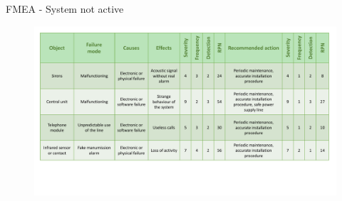 \begin{frame}{FMEA - System not active}
      \vskip 1.0cm
    \begin{figure}[ht!]
      \includegraphics[width=120mm]{images/fmea_system_not_active.pdf}
      \label{fig:fmea_system_not_active}
    \end{figure}
\end{frame}
